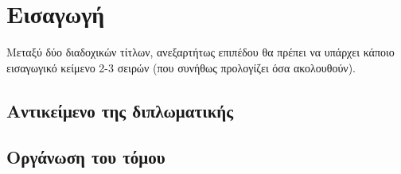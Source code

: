\documentclass[../main.tex]{subfiles}
\begin{document}
\section{Εισαγωγή}

Μεταξύ δύο διαδοχικών τίτλων, ανεξαρτήτως επιπέδου θα πρέπει να υπάρχει κάποιο εισαγωγικό κείμενο 2-3 σειρών (που συνήθως προλογίζει όσα ακολουθούν). 

\subsection{ Αντικείμενο της διπλωματικής}
\subsection{ Οργάνωση του τόμου}
\clearpage
\end{document}
